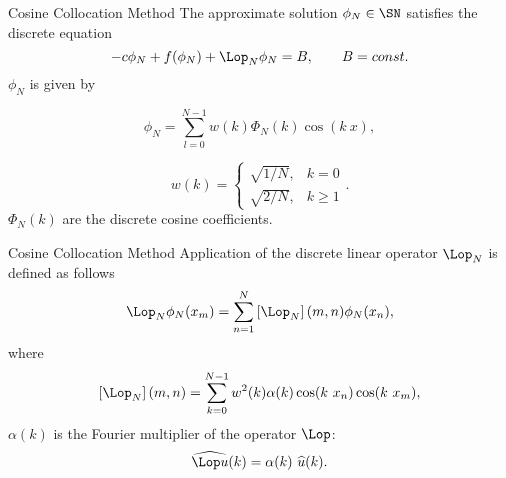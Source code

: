 \begin{frame}[t]{Cosine Collocation Method}
The approximate solution \textcolor{blue}{$\phi_N \in \SN$} satisfies the discrete equation 
	\begin{equation}
		-c\phi_N + f(\phi_N) + \Lop_N\phi_N = B, \qquad B = const. \label{disc}
	\end{equation}
\pause
$\phi_N$ is given by

	\begin{equation*}
		\phi_N = \sum_{l=0}^{N-1}w(k)\Phi_N(k)\cos(k~x), 
	\end{equation*}

	\begin{equation*}
		w(k)=\begin{cases} \sqrt{1/N}, &  k=0 \\ \sqrt{2/N}, & k\geq 1 \end{cases}.
	\end{equation*}
$\Phi_N(k)$ are the discrete cosine coefficients.
\end{frame}
\begin{frame}[t]{Cosine Collocation Method}
Application of the discrete linear operator $\Lop_N$ is defined as follows
	\begin{equation*}
		\Lop_N \phi_N(x_m) = \sum_{n=1}^{N}\left[ \Lop_N \right] (m,n)\phi_N(x_n),
	\end{equation*}
where \pause
	\begin{equation*}
		\left[ \Lop_N \right](m,n) = \sum_{k=0}^{N-1}w^2(k)\alpha(k) \cos(k~x_n)\cos(k~x_m),
	\end{equation*}
$\alpha(k)$ is the Fourier multiplier of the operator $\Lop$:
$$\widehat{\Lop u}(k)=\alpha(k)~\widehat{u}(k). $$
\end{frame}
